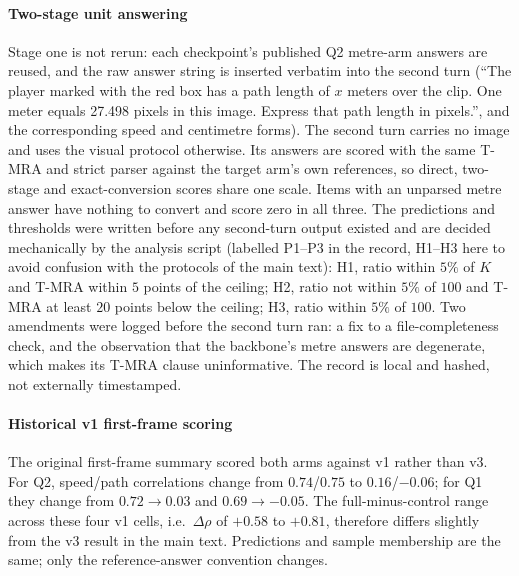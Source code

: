 \documentclass[11pt]{article}
\begin{document}
\paragraph{Two-stage unit answering}
\label{app:two_stage}
Stage one is not rerun: each checkpoint's published Q2 metre-arm answers are
reused, and the raw answer string is inserted verbatim into the second turn
(``The player marked with the red box has a path length of $x$ meters over
the clip. One meter equals 27.498 pixels in this image. Express that path
length in pixels.'', and the corresponding speed and centimetre forms). The
second turn carries no image and uses the visual protocol otherwise. Its
answers are scored with the same T-MRA and strict parser against the target
arm's own references, so direct, two-stage and exact-conversion scores share
one scale. Items with an unparsed metre answer have nothing to convert and
score zero in all three. The predictions and thresholds were written before
any second-turn output existed and are decided mechanically by the analysis
script (labelled P1--P3 in the record, H1--H3 here to avoid confusion with
the protocols of the main text): H1, ratio within $5\%$ of $K$
and T-MRA within $5$ points of the ceiling; H2, ratio not within $5\%$ of
$100$ and T-MRA at least $20$ points below the ceiling; H3, ratio within
$5\%$ of $100$. Two amendments were logged
before the second turn ran: a fix to a file-completeness check, and the
observation that the backbone's metre answers are degenerate, which makes its
T-MRA clause uninformative. The record is local and hashed, not externally
timestamped.

\paragraph{Historical v1 first-frame scoring} The original first-frame
summary scored both arms against v1 rather than v3. For Q2, speed/path
correlations change from $0.74$/$0.75$ to $0.16$/$-0.06$; for Q1 they
change from \mbox{$0.72\to0.03$} and \mbox{$0.69\to-0.05$}. The full-minus-control
range across these four v1 cells, i.e.\ $\Delta\rho$ of $+0.58$ to $+0.81$,
therefore differs slightly from the v3 result in
the main text. Predictions and sample membership are the
same; only the reference-answer convention changes.
\end{document}
